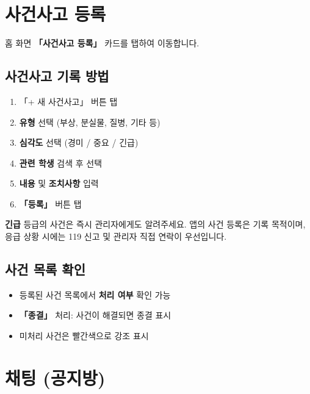 \documentclass[a4paper,11pt]{article}
\begin{document}
\section{사건사고 등록}

홈 화면 \textbf{「사건사고 등록」} 카드를 탭하여 이동합니다.

\subsection{사건사고 기록 방법}

\begin{tcolorbox}[stepbox]
\begin{enumerate}
  \item 「+ 새 사건사고」 버튼 탭
  \item \textbf{유형} 선택 (부상, 분실물, 질병, 기타 등)
  \item \textbf{심각도} 선택 (경미 / 중요 / 긴급)
  \item \textbf{관련 학생} 검색 후 선택
  \item \textbf{내용} 및 \textbf{조치사항} 입력
  \item \textbf{「등록」} 버튼 탭
\end{enumerate}
\end{tcolorbox}

\begin{tcolorbox}[warnbox]
\textbf{긴급} 등급의 사건은 즉시 관리자에게도 알려주세요. 앱의 사건 등록은 기록 목적이며, 응급 상황 시에는 119 신고 및 관리자 직접 연락이 우선입니다.
\end{tcolorbox}

\subsection{사건 목록 확인}

\begin{itemize}
  \item 등록된 사건 목록에서 \textbf{처리 여부} 확인 가능
  \item \textbf{「종결」} 처리: 사건이 해결되면 종결 표시
  \item 미처리 사건은 빨간색으로 강조 표시
\end{itemize}

\section{채팅 (공지방)}
\end{document}
